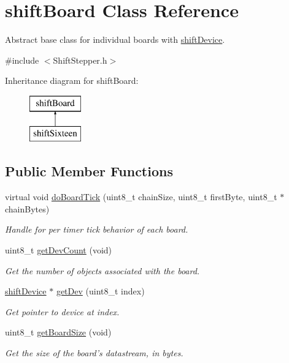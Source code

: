 \hypertarget{classshift_board}{
\section{shiftBoard Class Reference}
\label{classshift_board}
}


Abstract base class for individual boards with \hyperlink{classshift_device}{shiftDevice}.  




{\ttfamily \#include $<$ShiftStepper.h$>$}

Inheritance diagram for shiftBoard:\begin{figure}[H]
\begin{center}
\leavevmode
\includegraphics[height=2.000000cm]{classshift_board}
\end{center}
\end{figure}
\subsection*{Public Member Functions}
\begin{DoxyCompactItemize}
\item 
virtual void \hyperlink{classshift_board_a5a120f7aeb958c8e8fd0ec87eecc5798}{doBoardTick} (uint8\_\-t chainSize, uint8\_\-t firstByte, uint8\_\-t $\ast$chainBytes)
\begin{DoxyCompactList}\small\item\em Handle for per timer tick behavior of each board. \item\end{DoxyCompactList}\item 
uint8\_\-t \hyperlink{classshift_board_a7cf15ad074c5807b999bfcf490e2238a}{getDevCount} (void)
\begin{DoxyCompactList}\small\item\em Get the number of objects associated with the board. \item\end{DoxyCompactList}\item 
\hyperlink{classshift_device}{shiftDevice} $\ast$ \hyperlink{classshift_board_a0e47ab5a1c49478144a24342f34582d7}{getDev} (uint8\_\-t index)
\begin{DoxyCompactList}\small\item\em Get pointer to device at index. \item\end{DoxyCompactList}\item 
uint8\_\-t \hyperlink{classshift_board_ab60640025bb7557c57561a60bc97fc03}{getBoardSize} (void)
\begin{DoxyCompactList}\small\item\em Get the size of the board's datastream, in bytes. \item\end{DoxyCompactList}\end{DoxyCompactItemize}
